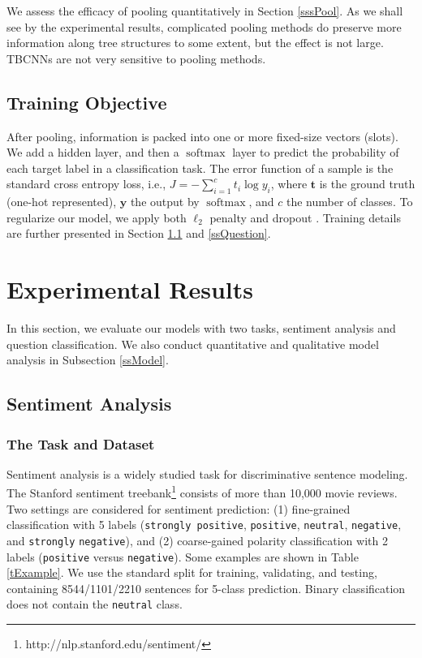\documentclass[11pt,a4paper]{article}
\begin{document}
\vspace{-.1cm}

We assess the efficacy of pooling quantitatively in Section \ref{sssPool}.
As we shall see by the experimental results, 
complicated pooling methods do preserve more information along tree structures to some
extent, but the effect is not large. TBCNNs are not very sensitive to pooling methods.
\subsection{Training Objective}\label{ssObjective}

After pooling, information is packed into one or more fixed-size vectors (slots).
We add a hidden layer, and then a $\operatorname{softmax}$
layer to predict the probability of each target label in a classification task.
The error function of a sample is the standard cross entropy loss, i.e.,
$J=-\sum_{i=1}^c t_i\log y_i$,
where $\bm t$ is the ground truth (one-hot represented),
$\bm y$ the output by $\operatorname{softmax}$, and $c$ the number of classes.
To regularize our model, we apply both $\ell_2$ penalty
and dropout \cite{dropout}.
Training details are further presented in Section \ref{ssSentiment} and \ref{ssQuestion}.

\section{Experimental Results}

In this section, we evaluate our models with two tasks,
sentiment analysis and question classification.
We also conduct quantitative and qualitative model analysis
in Subsection \ref{ssModel}.

\subsection{Sentiment Analysis}\label{ssSentiment}


\subsubsection{The Task and Dataset}
Sentiment analysis is a widely studied task for discriminative sentence modeling.
The Stanford sentiment treebank\footnote{http://nlp.stanford.edu/sentiment/} consists of more than 10,000 movie reviews.
Two settings are considered for sentiment prediction:
(1) fine-grained classification with 5 labels
(\verb|strongly positive|, \verb|positive|, \verb|neutral|,
\verb|negative|, and \verb|strongly| \verb|negative|), and
(2) coarse-gained polarity classification with 2 labels (\verb|positive| versus
\verb|negative|).
Some examples are shown in Table \ref{tExample}.
We use the standard split for training, validating, and testing, containing 8544/1101/2210 sentences for 5-class prediction.
Binary classification does not contain the \verb|neutral| class.
\end{document}
